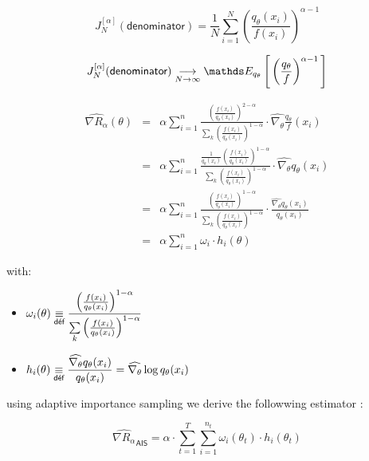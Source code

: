 $$J_N^{[\alpha]}(\textsf{denominator}) = \frac 1 N \sum\limits_{i=1}^N \left(\frac{q_\theta(x_i)}{f(x_i)}\right)^{\alpha - 1}$$

$$J_N^{[\alpha]}(\textsf{denominator}) \tend N \infty \esperanceloi {q_\theta} { \left(\frac{q_\theta}{f}\right) ^{\alpha-1}}$$

\[
	\begin{array}{rcl}
		
	\widehat{\nabla R_\alpha}(\theta)
 &=& 
 \displaystyle{ 
 \alpha  
 \sum\limits_{i=1}^{n}  
 \frac{\left( \frac{f(x_i)}{q_\theta(x_i)} \right)^{2-\alpha}}
 {\sum\limits_k 
 \left(\frac{f(x_i)}{q_\theta(x_i)}\right)^{1-\alpha}} 
 \cdot \widehat{\nabla_\theta} \frac{q_\theta}{f}(x_i)
 }
		\\
&=& \displaystyle{ \alpha  \sum\limits_{i=1}^{n}  \frac{\frac{1}{q_\theta(x_i)}\left( \frac{f(x_i)}{q_\theta(x_i)} \right)^{1-\alpha}}{\sum\limits_k \left(\frac{f(x_i)}{q_\theta(x_i)}\right)^{1-\alpha}} \cdot \widehat{\nabla_\theta} {q_\theta}(x_i)}
  \\
  &=&\displaystyle{ \alpha  \sum\limits_{i=1}^{n}  \frac{\left( \frac{f(x_i)}{q_\theta(x_i)} \right)^{1-\alpha}}{\sum\limits_k \left(\frac{f(x_i)}{q_\theta(x_i)}\right)^{1-\alpha}} \cdot \frac{\widehat{\nabla_\theta} {q_\theta}(x_i)}{q_\theta(x_i)}}
  \\
	&=& \displaystyle{ \alpha \sum\limits_{i=1}^{n} \omega_i \cdot h_i(\theta)}
\end{array}
\]

	with:
	\begin{itemize}
	
		\item $\displaystyle{\omega_i(\theta) \isdef \frac{\left( \frac{f(x_i)}{q_\theta(x_i)} \right)^{1-\alpha}}{\sum\limits_k \left(\frac{f(x_i)}{q_\theta(x_i)}\right)^{1-\alpha}}}$
		\item $\displaystyle{h_i(\theta) \isdef \frac{\widehat{\nabla_\theta} {q_\theta}(x_i)}{q_\theta(x_i)}} = \widehat{\nabla_\theta} \log q_\theta(x_i)$
	\end{itemize}


using adaptive importance sampling we derive the followwing estimator :


$$\boxed{\widehat{\nabla R_\alpha}_{\textsf{AIS}} = \alpha \cdot \sum\limits_{t=1}^T \sum\limits_{i = 1}^{n_t} \omega_i(\theta_t) \cdot h_i(\theta_t)}$$



